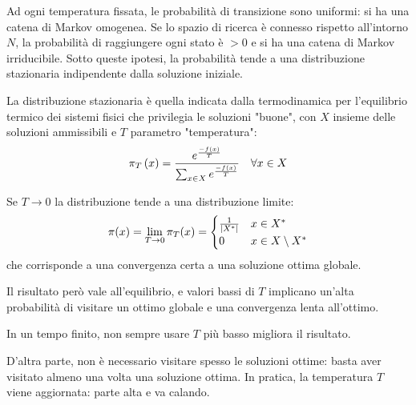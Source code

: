\documentclass[\main/main.tex]{subfiles}
\begin{document}
\begin{multicols}{2}
\begin{analysis}
Ad ogni temperatura fissata, le probabilità di transizione sono uniformi: si ha una catena di Markov omogenea. Se lo spazio di ricerca è connesso rispetto all'intorno \(N\), la probabilità di raggiungere ogni stato è \(> 0\) e si ha una catena di Markov irriducibile. Sotto queste ipotesi, la probabilità tende a una distribuzione stazionaria indipendente dalla soluzione iniziale.

La distribuzione stazionaria è quella indicata dalla termodinamica per l'equilibrio termico dei sistemi fisici che privilegia le soluzioni "buone", con \(X\) insieme delle soluzioni ammissibili e \(T\) parametro "temperatura":
\[
    \pi_T \left(x\right) = \frac{e^{\frac{-f(x)}{T}}}{\sum_{x \in X} e^{\frac{-f(x)}{T}}} \quad \forall x \in X
\]

Se \(T \rightarrow 0\) la distribuzione tende a una distribuzione limite:
\[
    \pi(x) = \lim_{T\rightarrow 0} \pi_T(x) = \begin{cases}
        \frac{1}{\left\lvert X^*\right\rvert} & x \in X^*\\
        0 & x \in X \setminus X^*
    \end{cases}
\]
che corrisponde a una convergenza certa a una soluzione ottima globale.

Il risultato però vale all'equilibrio, e valori bassi di \(T\) implicano un'alta probabilità di visitare un ottimo globale e una convergenza lenta all'ottimo.

In un tempo finito, non sempre usare \(T\) più basso migliora il risultato.

D'altra parte, non è necessario visitare spesso le soluzioni ottime: basta aver visitato almeno una volta una soluzione ottima. In pratica, la temperatura \(T\) viene aggiornata: parte alta e va calando.


\end{analysis}
\end{multicols}
\end{document}
